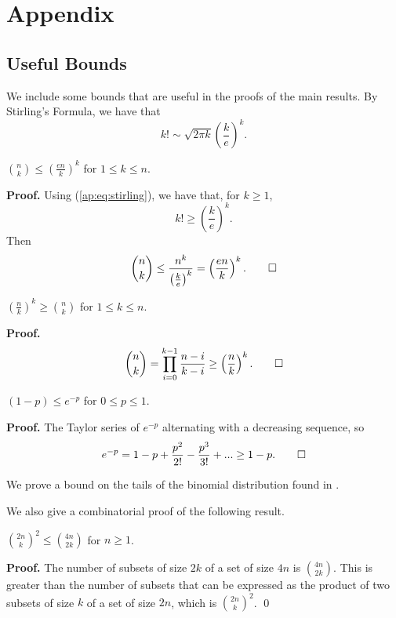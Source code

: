 \chapter{Appendix}
\section{Useful Bounds}

We include some bounds that are useful in the proofs of the main results. By Stirling's Formula, we have that
\begin{equation}\label{ap:eq:stirling}
    k! \sim \sqrt{2\pi k}\left(\frac{k}{e}\right)^k.
\end{equation}

\begin{proposition}\label{ap:prop:upperbinom}
    $\binom{n}{k} \leq \left(\frac{en}{k}\right)^k$ for $1 \leq k \leq n$. 
\end{proposition}

\textbf{Proof. } Using (\ref{ap:eq:stirling}), we have that, for $k \geq 1$, 
\[k! \geq \left(\frac{k}{e}\right)^k.\]
Then
\[\binom{n}{k} \leq \frac{n^k}{\left(\frac{k}{e}\right)^k} = \left(\frac{en}{k}\right)^k. \qed\]

\begin{proposition}\label{ap:prop:lowebinom}
    $\left(\frac{n}{k}\right)^k \geq \binom{n}{k}$ for $1 \leq k \leq n$.
\end{proposition}

\textbf{Proof. }
\[\binom{n}{k} = \prod_{i = 0}^{k - 1} \frac{n - i}{k - i} \geq \left(\frac{n}{k}\right)^k. \qed\]

\begin{proposition}\label{ap:prop:exp}
    $(1 - p) \leq e^{-p}$ for $0 \leq p \leq 1$.
\end{proposition}

\textbf{Proof. } The Taylor series of $e^{-p}$ alternating with a decreasing sequence, so
\[e^{-p} = 1 - p + \frac{p^2}{2!} - \frac{p^3}{3!} + ... \geq 1 - p. \qed\]

We prove a bound on the tails of the binomial distribution found in \cite{feller}.

We also give a combinatorial proof of the following result.

\begin{proposition}\label{ap:prop:binom}
    $\binom{2n}{k}^2 \leq \binom{4n}{2k}$ for $n \geq 1$. 
\end{proposition}

\textbf{Proof. } The number of subsets of size $2k$ of a set of size $4n$ is $\binom{4n}{2k}$. This is greater than the number of subsets that can be expressed as the product of two subsets of size $k$ of a set of size $2n$, which is $\binom{2n}{k}^2$. \qed

